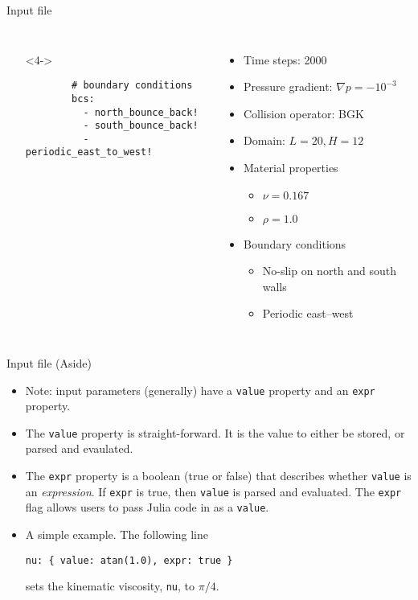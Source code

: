 \documentclass[pdf]{beamer}
\begin{document}
\begin{frame}[fragile]{Input file}
\begin{columns}
\begin{itemize}
    \item[] <4->
      \begin{verbatim}
        # boundary conditions
        bcs:
          - north_bounce_back!
          - south_bounce_back!
          - periodic_east_to_west!
      \end{verbatim}
      \end{itemize}
      \small
      \begin{itemize}
        \item <1-> Time steps: 2000
        \item Pressure gradient: $\nabla p = -10^{-3}$
        \item Collision operator: BGK
        \item <2-> Domain: $L = 20, H = 12$
        \item <3-> Material properties 
          \begin{itemize}
            \item $\nu = 0.167$
            \item $\rho = 1.0$
          \end{itemize}
        \item <4-> Boundary conditions
          \begin{itemize}
            \item No-slip on north and south walls
            \item Periodic east--west
          \end{itemize}
      \end{itemize}
  \end{columns}
\end{frame}

\begin{frame}{Input file (Aside)}
  \begin{itemize}
    \item <1-> Note: input parameters (generally) have a \texttt{value} property and an \texttt{expr} property.
    \item <2-> The \texttt{value} property is straight-forward.
          It is the value to either be stored, or parsed and evaulated.
    \item <3-> The \texttt{expr} property is a boolean (true or false) that describes whether \texttt{value} is an \textit{expression}.
      If \texttt{expr} is true, then \texttt{value} is parsed and evaluated.
      The \texttt{expr} flag allows users to pass Julia code in as a \texttt{value}.
    \item <4-> A simple example. The following line

      \texttt{nu:     \{ value: atan(1.0),  expr: true \}}

      sets the kinematic viscosity, \texttt{nu}, to $\pi / 4$.
  \end{itemize}
\end{frame}
\end{document}
